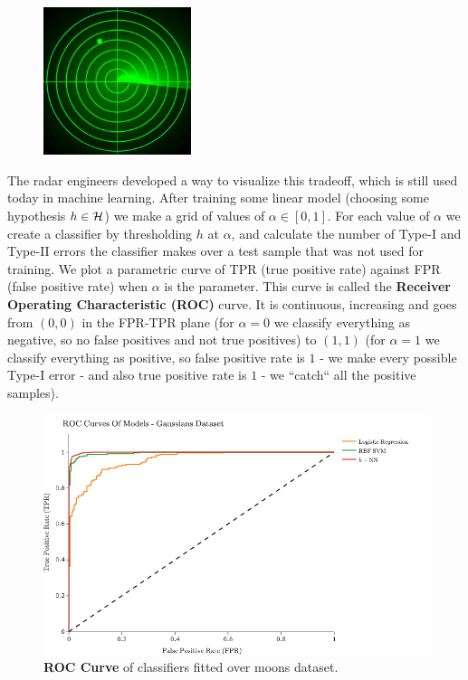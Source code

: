 \begin{figure}[h!]
	\centering
	\includegraphics[width=1.7in]{chapters/classification/figures/radar.jpg}
	\caption{}
\end{figure}

The radar engineers developed a way to visualize this tradeoff, which is still used today in machine learning. After training some linear model (choosing some hypothesis $h\in\mathcal{H}$) we make a grid of values of $\alpha\in\left[0,1\right]$. For each value of $\alpha$ we create a classifier by thresholding  $h$ at $\alpha$, and calculate the number of  Type-I and Type-II errors the classifier makes over a test sample that was not used for training.  We plot a parametric curve of TPR (true positive rate) against FPR (false positive rate) when $\alpha$ is the parameter. This curve is called the \textbf{Receiver Operating Characteristic (ROC)} curve. It is continuous, increasing and goes from $(0,0)$ in the FPR-TPR plane (for $\alpha=0$ we classify everything as negative, so no false positives and not true positives) to $(1,1)$ (for $\alpha=1$ we classify everything as positive, so false positive rate is $1$ - we make every possible Type-I error - and also true positive rate is $1$ - we ``catch`` all the positive samples).

\begin{figure}[h!]
	\centering
	\includegraphics[width=.75\textwidth]{chapters/classification/figures/roc.png}
	\caption{\textbf{ROC Curve} of classifiers fitted over moons dataset. \GitChapterThreeExamples}
\end{figure}

